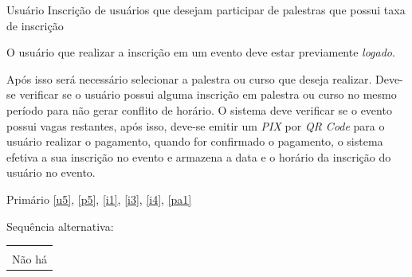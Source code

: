 {Usuário}
{Inscrição de usuários que desejam participar de palestras que possui taxa de inscrição}
{O usuário que realizar a inscrição em um evento deve estar previamente \textit{logado}.

Após isso será necessário selecionar a palestra ou curso que deseja realizar. Deve-se verificar se o usuário possui alguma inscrição em palestra ou curso no mesmo período para não gerar conflito de horário. O sistema deve verificar se o evento possui vagas restantes, após isso, deve-se emitir um \textit{PIX} por \textit{QR Code} para o usuário realizar o pagamento, quando for confirmado o pagamento, o sistema efetiva a sua inscrição no evento e armazena a data e o horário da inscrição do usuário no evento.}
{Primário}
{\ref{u5}, \ref{p5}, \ref{i1}, \ref{i3}, \ref{i4}, \ref{pa1}}


Sequência alternativa:
\begin{table}[H]
    \centering
    \begin{tabular}{|p{15cm}|}
        \hline\\
            Não há\\
        \hline
    \end{tabular}
\end{table}


